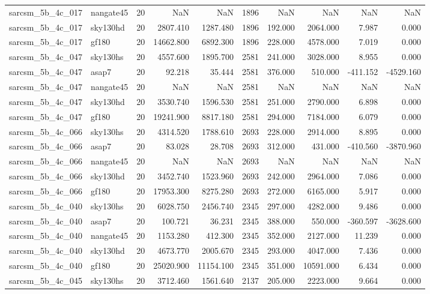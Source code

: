 \begin{longtable}{llrrrrrrrr}
sarcsm\_5b\_4c\_017 & nangate45 & 20 & NaN & NaN & 1896 & NaN & NaN & NaN & NaN \\
sarcsm\_5b\_4c\_017 & sky130hd & 20 & 2807.410 & 1287.480 & 1896 & 192.000 & 2064.000 & 7.987 & 0.000 \\
sarcsm\_5b\_4c\_017 & gf180 & 20 & 14662.800 & 6892.300 & 1896 & 228.000 & 4578.000 & 7.019 & 0.000 \\
sarcsm\_5b\_4c\_047 & sky130hs & 20 & 4557.600 & 1895.700 & 2581 & 241.000 & 3028.000 & 8.955 & 0.000 \\
sarcsm\_5b\_4c\_047 & asap7 & 20 & 92.218 & 35.444 & 2581 & 376.000 & 510.000 & -411.152 & -4529.160 \\
sarcsm\_5b\_4c\_047 & nangate45 & 20 & NaN & NaN & 2581 & NaN & NaN & NaN & NaN \\
sarcsm\_5b\_4c\_047 & sky130hd & 20 & 3530.740 & 1596.530 & 2581 & 251.000 & 2790.000 & 6.898 & 0.000 \\
sarcsm\_5b\_4c\_047 & gf180 & 20 & 19241.900 & 8817.180 & 2581 & 294.000 & 7184.000 & 6.079 & 0.000 \\
sarcsm\_5b\_4c\_066 & sky130hs & 20 & 4314.520 & 1788.610 & 2693 & 228.000 & 2914.000 & 8.895 & 0.000 \\
sarcsm\_5b\_4c\_066 & asap7 & 20 & 83.028 & 28.708 & 2693 & 312.000 & 431.000 & -410.560 & -3870.960 \\
sarcsm\_5b\_4c\_066 & nangate45 & 20 & NaN & NaN & 2693 & NaN & NaN & NaN & NaN \\
sarcsm\_5b\_4c\_066 & sky130hd & 20 & 3452.740 & 1523.960 & 2693 & 242.000 & 2964.000 & 7.086 & 0.000 \\
sarcsm\_5b\_4c\_066 & gf180 & 20 & 17953.300 & 8275.280 & 2693 & 272.000 & 6165.000 & 5.917 & 0.000 \\
sarcsm\_5b\_4c\_040 & sky130hs & 20 & 6028.750 & 2456.740 & 2345 & 297.000 & 4282.000 & 9.486 & 0.000 \\
sarcsm\_5b\_4c\_040 & asap7 & 20 & 100.721 & 36.231 & 2345 & 388.000 & 550.000 & -360.597 & -3628.600 \\
sarcsm\_5b\_4c\_040 & nangate45 & 20 & 1153.280 & 412.300 & 2345 & 352.000 & 2127.000 & 11.239 & 0.000 \\
sarcsm\_5b\_4c\_040 & sky130hd & 20 & 4673.770 & 2005.670 & 2345 & 293.000 & 4047.000 & 7.436 & 0.000 \\
sarcsm\_5b\_4c\_040 & gf180 & 20 & 25020.900 & 11154.100 & 2345 & 351.000 & 10591.000 & 6.434 & 0.000 \\
sarcsm\_5b\_4c\_045 & sky130hs & 20 & 3712.460 & 1561.640 & 2137 & 205.000 & 2223.000 & 9.664 & 0.000 \\

\end{longtable}
